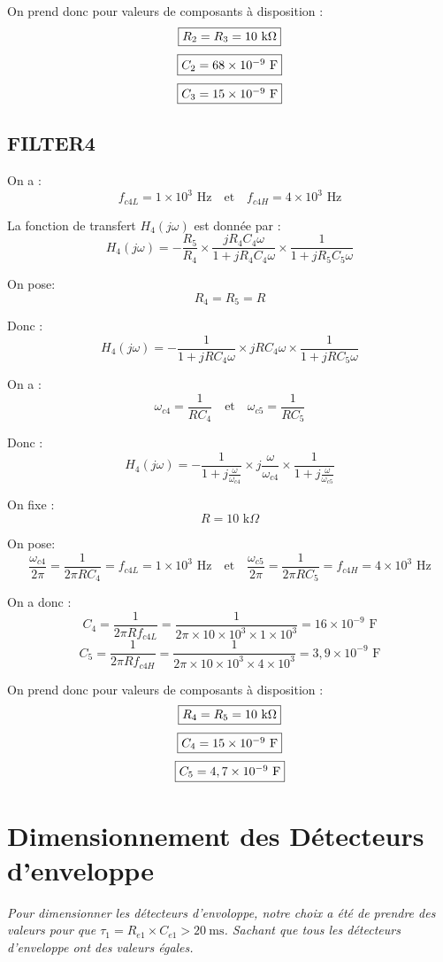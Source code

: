 \documentclass{report}
\begin{document}
On prend donc pour valeurs de composants à disposition :
\[\fbox{$R_2 = R_3 = 10 \text{ k}\Omega$}
\]
\[\fbox{$C_2 = 68 \times 10^{-9} \text{ F}$}
\]
\[\fbox{$C_3 = 15 \times 10^{-9} \text{ F}$}
\]

\newpage

\subsection{FILTER4}
On a :
\[f_{c4L} = 1 \times 10^3 \text{ Hz} \quad \text{et} \quad f_{c4H} = 4 \times 10^3 \text{ Hz}
\] 

La fonction de transfert \( H_4(j\omega) \) est donnée par :
\[H_4(j\omega) = -\frac{R_5}{R_4} \times \frac{j R_4 C_4 \omega}{1 + j R_4 C_4 \omega} \times \frac{1}{1 + j R_5 C_5 \omega}
\]

On pose: 
\[R_4 = R_5 = R
\]

Donc :
\[H_4(j\omega) = -\frac{1}{1 + j R C_4 \omega} \times j R C_4 \omega \times \frac{1}{1 + j R C_5 \omega}
\]

On a : 
\[\omega_{c4} = \frac{1}{R C_4} \quad \text{et} \quad \omega_{c5} = \frac{1}{R C_5}\]

Donc :
\[H_4(j\omega) = -\frac{1}{1 + j \frac{\omega}{\omega_{c4}}} \times j \frac{\omega}{\omega_{c4}} \times \frac{1}{1 + j \frac{\omega}{\omega_{c5}}}
\]

On fixe :
\[R = 10 \text{ k}\Omega
\]

On pose: 
\[\frac{\omega_{c4}}{2\pi} = \frac{1}{2\pi R C_4} = f_{c4L} = 1 \times 10^3 \text{ Hz}
 \quad \text{et} \quad \frac{\omega_{c5}}{2\pi} = \frac{1}{2\pi R C_5} = f_{c4H} = 4 \times 10^3 \text{ Hz}
\]

On a donc :
\[C_4 = \frac{1}{2\pi R f_{c4L}} = \frac{1}{2\pi \times 10 \times 10^3 \times 1 \times 10^3} = 16 \times 10^{-9} \text{ F}
\]
\[C_5 = \frac{1}{2\pi R f_{c4H}} = \frac{1}{2\pi \times 10 \times 10^3 \times 4 \times 10^3} = 3,9 \times 10^{-9} \text{ F}
\]

On prend donc pour valeurs de composants à disposition :
\[\fbox{$R_4 = R_5 = 10 \text{ k}\Omega$}
\]
\[\fbox{$C_4 = 15 \times 10^{-9} \text{ F}$}
\]
\[\fbox{$C_5 = 4,7 \times 10^{-9} \text{ F}$}
\]

\newpage

\section{Dimensionnement des Détecteurs d'enveloppe}
\textit{Pour dimensionner les détecteurs d'envoloppe, notre choix a été de prendre des valeurs pour que \({\tau_1} = R_{e1} \times C_{e1} > 20~\mathrm{ms}\). Sachant que tous les détecteurs d'enveloppe ont des valeurs égales.}
\\
\end{document}
